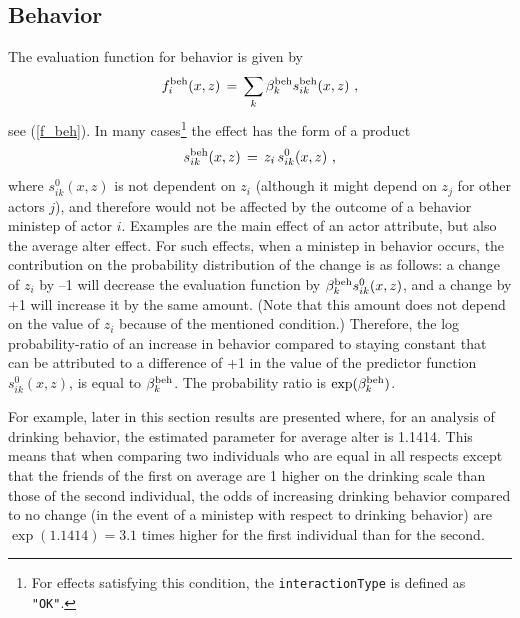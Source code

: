 \documentclass[a4paper,fleqn,11pt]{article}
\newcommand{\+}{\, + \,}
\begin{document}
\subsection{Behavior}

The evaluation function for behavior is given by
\[
f^{\rm beh}_i(x, z) \, = \, \sum_k \beta^{\rm beh}_k s^{\rm beh}_{ik}(x, z) \ ,
\]
see (\ref{f_beh}).
In many cases\footnote{For effects satisfying this condition,
the \texttt{interactionType} is defined as \texttt{"OK"}.}
the effect has the form of a product
\begin{equation}
s^{\rm beh}_{ik}(x, z) \,=\, z_i \,s^{0}_{ik}(x, z) \ ,  \label{beh_generic}
\end{equation}
where $s^{0}_{ik}(x, z)$ is not dependent on $z_i$
(although it might depend on $z_j$ for other actors $j$), and therefore
would not be affected by the outcome of a behavior ministep of actor $i$.
Examples are the main effect of an actor attribute, but also the
average alter effect.
For such effects,
when a ministep in behavior occurs, the contribution
on the probability distribution of the change is as follows:
a change of $z_i $ by --1 will decrease the evaluation function by
$\beta^{\rm beh}_k s^{0}_{ik}(x, z)$,
and a change by +1 will increase it by the same amount.
(Note that this amount does not depend on the value of $z_i$
because of the mentioned condition.)
Therefore, the log probability-ratio of an increase in behavior compared to
staying constant that can be attributed to a difference of +1 in the
value of the predictor function $s^{0}_{ik}(x, z)$, is equal to
$\beta^{\rm beh}_k$. The probability ratio is $\exp(\beta^{\rm beh}_k)$.

For example, later in this section results are presented where,
for an analysis of drinking behavior, the
estimated parameter for average alter is 1.1414.
This means that when comparing two individuals who are equal in all respects
except that the friends of the first on average are  1 higher
on the drinking scale than those of the second individual,
the odds of increasing drinking behavior compared to no change
(in the event of a ministep with respect to drinking behavior)
are $\exp(1.1414) = 3.1$ times higher for the first individual
than for the second.
\medskip
\end{document}

